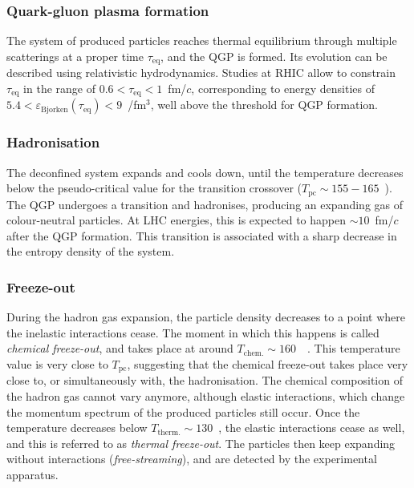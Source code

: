 \subsubsection{Quark-gluon plasma formation}
The system of produced particles reaches thermal equilibrium through multiple scatterings at a proper time $\tau_\mathrm{eq}$, and the QGP is formed. Its evolution can be described using relativistic hydrodynamics. Studies at RHIC allow to constrain $\tau_\mathrm{eq}$ in the range of $0.6<\tau_\mathrm{eq}<1$~fm/$c$, corresponding to energy densities of $5.4 < \varepsilon_\mathrm{Bjorken}(\tau_\mathrm{eq})< 9$~\gev/fm$^3$, well above the threshold for QGP formation.
\subsubsection{Hadronisation}
The deconfined system expands and cools down, until the temperature decreases below the pseudo-critical value for the transition crossover ($T_\mathrm{pc}\sim 155-165$~\mev). The QGP undergoes a transition and hadronises, producing an expanding gas of colour-neutral particles. At LHC energies, this is expected to happen $\sim 10$~fm/$c$~\cite{ALICE:2011dyt} after the QGP formation. This transition is associated with a sharp decrease in the entropy density of the system.

\subsubsection{Freeze-out}
During the hadron gas expansion, the particle density decreases to a point where the inelastic interactions cease. The moment in which this happens is called \emph{chemical freeze-out}, and takes place at around $T_\mathrm{chem.}\sim160$~\mev~\cite{Andronic:2017pug}. This temperature value is very close to $T_\mathrm{pc}$, suggesting that the chemical freeze-out takes place very close to, or simultaneously with, the hadronisation. The chemical composition of the hadron gas cannot vary anymore, although elastic interactions, which change the momentum spectrum of the produced particles still occur. Once the temperature decreases below $T_\mathrm{therm.}\sim 130$~\mev, the elastic interactions cease as well, and this is referred to as \emph{thermal freeze-out}. The particles then keep expanding without interactions (\emph{free-streaming}), and are detected by the experimental apparatus.

